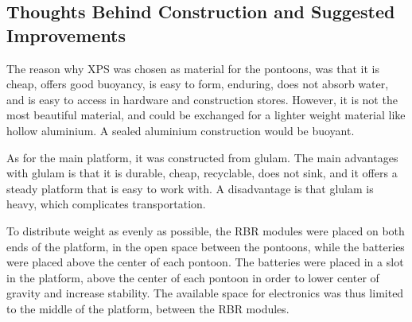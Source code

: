 \subsection{Thoughts Behind Construction and Suggested Improvements}
The reason why XPS was chosen as material for the pontoons, was that it is cheap, offers good buoyancy, is easy to form, enduring, does not absorb water, and is easy to access in hardware and construction stores. However, it is not the most beautiful material, and could be exchanged for a lighter weight material like hollow aluminium. A sealed aluminium construction would be buoyant.

As for the main platform, it was constructed from glulam. The main advantages with glulam is that it is durable, cheap, recyclable, does not sink, and it offers a steady platform that is easy to work with. A disadvantage is that glulam is heavy, which complicates transportation.




To distribute weight as evenly as possible, the RBR modules were placed on both ends of the platform, in the open space between the pontoons, while the batteries were placed above the center of each pontoon. The batteries were placed in a slot in the platform, above the center of each pontoon in order to lower center of gravity and increase stability. The available space for electronics was thus limited to the middle of the platform, between the RBR modules.

